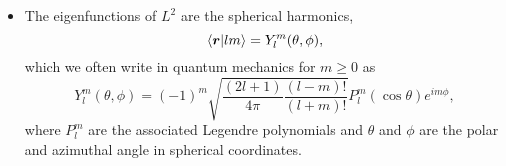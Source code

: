 \documentclass[11pt, a4paper]{article}
\renewcommand{\vec}[1]{\bm{#1}}  %
\renewcommand{\r}{\vec{r}}  %
\begin{document}
\begin{itemize}
    \item The eigenfunctions of $ L^{2} $ are the spherical harmonics,
    \begin{equation*}
        \braket{\r}{lm} = Y_{l}^{m}(\theta, \phi),
    \end{equation*}
	which we often write in quantum mechanics for $ m \geq 0  $ as
	\begin{equation*}
		Y_{l}^{m}(\theta, \phi) = (-1)^{m}\sqrt{\frac{(2l+1)}{4\pi}\frac{(l-m)!}{(l+m)!}} P_{l}^{m}(\cos \theta)e^{im\phi},
	\end{equation*}
	where $ P_{l}^{m} $ are the associated Legendre polynomials and $ \theta $ and $ \phi $ are the polar and azimuthal angle in spherical coordinates.
    
    
    
    
\end{itemize}
\end{document}
